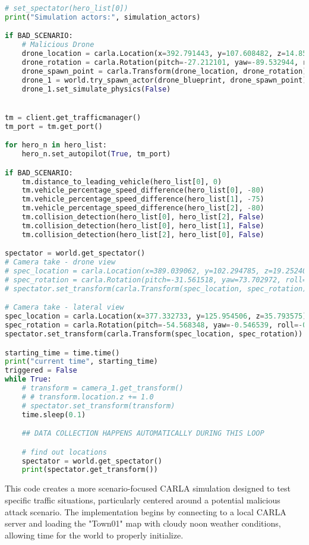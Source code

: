 \begin{lstlisting}[language=Python, caption={Example Use case where data is collected from 3 cars and a drone may be used to perform attacks to the communication channels},label={code:use-case}]
# set_spectator(hero_list[0])
print("Simulation actors:", simulation_actors)

if BAD_SCENARIO:
    # Malicious Drone
    drone_location = carla.Location(x=392.791443, y=107.608482, z=14.855516)
    drone_rotation = carla.Rotation(pitch=-27.212101, yaw=-89.532944, roll=-0.025725)
    drone_spawn_point = carla.Transform(drone_location, drone_rotation)
    drone_1 = world.try_spawn_actor(drone_blueprint, drone_spawn_point)
    drone_1.set_simulate_physics(False)


tm = client.get_trafficmanager()
tm_port = tm.get_port()

for hero_n in hero_list:
    hero_n.set_autopilot(True, tm_port)

if BAD_SCENARIO:
    tm.distance_to_leading_vehicle(hero_list[0], 0)
    tm.vehicle_percentage_speed_difference(hero_list[0], -80)
    tm.vehicle_percentage_speed_difference(hero_list[1], -75)
    tm.vehicle_percentage_speed_difference(hero_list[2], -80)
    tm.collision_detection(hero_list[0], hero_list[2], False)
    tm.collision_detection(hero_list[0], hero_list[1], False)
    tm.collision_detection(hero_list[2], hero_list[0], False)

spectator = world.get_spectator()
# Camera take - drone view
# spec_location = carla.Location(x=389.039062, y=102.294785, z=19.252405)
# spec_rotation = carla.Rotation(pitch=-31.561518, yaw=73.702972, roll=-0.018310)
# spectator.set_transform(carla.Transform(spec_location, spec_rotation))

# Camera take - lateral view
spec_location = carla.Location(x=377.332733, y=125.954506, z=35.793575)
spec_rotation = carla.Rotation(pitch=-54.568348, yaw=-0.546539, roll=-0.018311)
spectator.set_transform(carla.Transform(spec_location, spec_rotation))

starting_time = time.time()
print("current time", starting_time)
triggered = False
while True:
    # transform = camera_1.get_transform()
    # # transform.location.z += 1.0
    # spectator.set_transform(transform)
    time.sleep(0.1)

    ## DATA COLLECTION HAPPENS AUTOMATICALLY DURING THIS LOOP

    # find out locations
    spectator = world.get_spectator()
    print(spectator.get_transform())
\end{lstlisting}

This code creates a more scenario-focused CARLA simulation designed to test specific traffic situations, particularly centered around a potential malicious attack scenario. The implementation begins by connecting to a local CARLA server and loading the "Town01" map with cloudy noon weather conditions, allowing time for the world to properly initialize.

